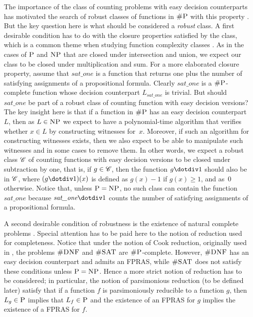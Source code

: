The importance of the class of counting problems with easy decision counterparts has motivated the search of robust classes of functions in $\text{\sc \#P}$ with this property \cite{PagourtzisZ06}. But the key question here is what should be considered a {\em robust} class. 
A first desirable condition has to do with the closure properties satisfied by the class, which is a common theme when studying function complexity classes \cite{OH93,FH08}. As in the cases of $\text{\sc P}$ and $\text{\sc NP}$ that are closed under intersection and union, we expect our class to be closed under multiplication and sum. For a more elaborated closure property, assume that $\textit{sat\_one}$ is a function that returns one plus the number of satisfying assignments of a propositional formula. Clearly $\textit{sat\_one}$ is a $\text{\sc \#P}$-complete function whose decision counterpart $L_{\textit{sat\_one}}$ is trivial. But should $\textit{sat\_one}$ be part of a robust class of counting function with easy decision versions? The key insight here is that if a function in $\text{\sc \#P}$ has an easy decision counterpart $L$, then as $L \in \text{\sc NP}$ we expect  to have a polynomial-time algorithm that verifies whether $x \in L$ by constructing witnesses for~$x$. 
Moreover, if such an algorithm for constructing witnesses exists, then we also expect to be able to manipulate such witnesses and in some cases to remove them. In other words, we expect a robust class $\mathscr{C}$ of counting functions with easy decision versions to be closed under subtraction by one, that is, if $g \in \mathscr{C}$, then the function $g \dotdiv 1$ should also be in $\mathscr{C}$, where $(g \dotdiv 1)(x)$ is defined as $g(x) - 1$ if $g(x) \geq 1$, and as~$0$ otherwise. Notice that, unless $\text{\sc P} = \text{\sc NP}$, no such class can contain the function $\textit{sat\_one}$ because $\textit{sat\_one} \dotdiv 1$ counts the number of satisfying assignments of a propositional formula.

A second desirable condition of robustness is the existence of natural complete problems \cite{P94}. Special attention has to be paid here to the notion of reduction used for completeness. Notice that under the notion of Cook reduction, originally used in \cite{Valiant79}, the problems $\textsc{\#DNF}$ and $\textsc{\#SAT}$ are $\text{\sc \#P}$-complete. However, $\textsc{\#DNF}$ has an easy decision counterpart and admits an FPRAS, while $\textsc{\#SAT}$ does not satisfy these conditions unless $\text{\sc P} = \text{\sc NP}$. Hence a more strict notion of reduction has to be considered; in particular, the notion of parsimonious reduction (to be defined later) satisfy that if a function $f$ is parsimoniously reducible to a function $g$, then $L_g \in \text{\sc P}$ implies that $L_f \in \text{\sc P}$ and the existence of an FPRAS for $g$ implies the existence of a FPRAS for $f$. 
 
